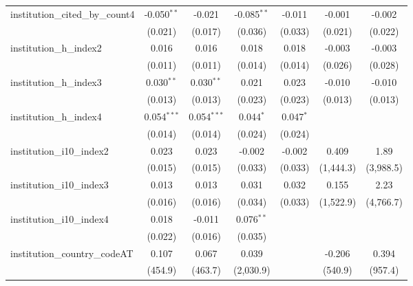 \begin{tabular}{lcccccc}
   institution\_cited\_by\_count4        & -0.050$^{**}$ & -0.021        & -0.085$^{**}$  & -0.011         & -0.001    & -0.002\\   
                                         & (0.021)       & (0.017)       & (0.036)        & (0.033)        & (0.021)   & (0.022)\\   
   institution\_h\_index2                & 0.016         & 0.016         & 0.018          & 0.018          & -0.003    & -0.003\\   
                                         & (0.011)       & (0.011)       & (0.014)        & (0.014)        & (0.026)   & (0.028)\\   
   institution\_h\_index3                & 0.030$^{**}$  & 0.030$^{**}$  & 0.021          & 0.023          & -0.010    & -0.010\\   
                                         & (0.013)       & (0.013)       & (0.023)        & (0.023)        & (0.013)   & (0.013)\\   
   institution\_h\_index4                & 0.054$^{***}$ & 0.054$^{***}$ & 0.044$^{*}$    & 0.047$^{*}$    &           &   \\   
                                         & (0.014)       & (0.014)       & (0.024)        & (0.024)        &           &   \\   
   institution\_i10\_index2              & 0.023         & 0.023         & -0.002         & -0.002         & 0.409     & 1.89\\   
                                         & (0.015)       & (0.015)       & (0.033)        & (0.033)        & (1,444.3) & (3,988.5)\\   
   institution\_i10\_index3              & 0.013         & 0.013         & 0.031          & 0.032          & 0.155     & 2.23\\   
                                         & (0.016)       & (0.016)       & (0.034)        & (0.033)        & (1,522.9) & (4,766.7)\\   
   institution\_i10\_index4              & 0.018         & -0.011        & 0.076$^{**}$   &                &           &   \\   
                                         & (0.022)       & (0.016)       & (0.035)        &                &           &   \\   
   institution\_country\_codeAT          & 0.107         & 0.067         & 0.039          &                & -0.206    & 0.394\\   
                                         & (454.9)       & (463.7)       & (2,030.9)      &                & (540.9)   & (957.4)\\   

\end{tabular}
